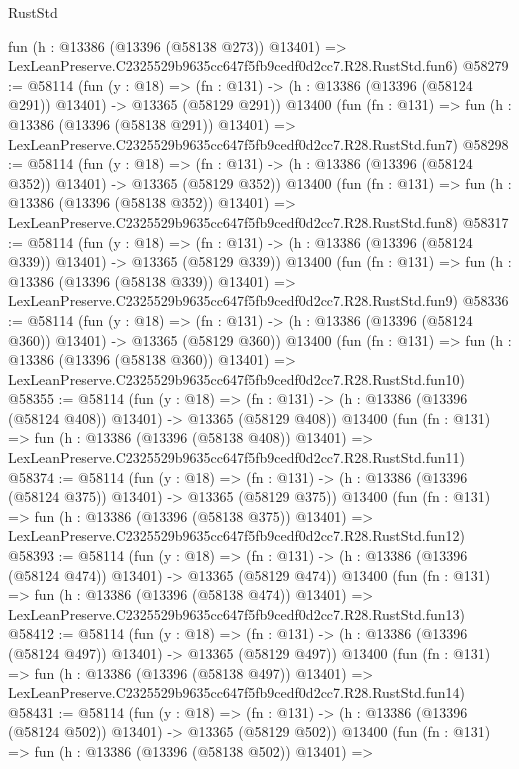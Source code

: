 \begin{lexlean}{RustStd}
\begin{coremodule}
    fun (h : @13386 (@13396 (@58138 @273)) @13401) =>
    LexLeanPreserve.C2325529b9635cc647f5fb9cedf0d2cc7.R28.RustStd.fun6)
@58279 := @58114
    (fun (y : @18) =>
    (fn : @131) -> (h : @13386 (@13396 (@58124 @291)) @13401) -> @13365 (@58129 @291))
    @13400
    (fun (fn : @131) =>
    fun (h : @13386 (@13396 (@58138 @291)) @13401) =>
    LexLeanPreserve.C2325529b9635cc647f5fb9cedf0d2cc7.R28.RustStd.fun7)
@58298 := @58114
    (fun (y : @18) =>
    (fn : @131) -> (h : @13386 (@13396 (@58124 @352)) @13401) -> @13365 (@58129 @352))
    @13400
    (fun (fn : @131) =>
    fun (h : @13386 (@13396 (@58138 @352)) @13401) =>
    LexLeanPreserve.C2325529b9635cc647f5fb9cedf0d2cc7.R28.RustStd.fun8)
@58317 := @58114
    (fun (y : @18) =>
    (fn : @131) -> (h : @13386 (@13396 (@58124 @339)) @13401) -> @13365 (@58129 @339))
    @13400
    (fun (fn : @131) =>
    fun (h : @13386 (@13396 (@58138 @339)) @13401) =>
    LexLeanPreserve.C2325529b9635cc647f5fb9cedf0d2cc7.R28.RustStd.fun9)
@58336 := @58114
    (fun (y : @18) =>
    (fn : @131) -> (h : @13386 (@13396 (@58124 @360)) @13401) -> @13365 (@58129 @360))
    @13400
    (fun (fn : @131) =>
    fun (h : @13386 (@13396 (@58138 @360)) @13401) =>
    LexLeanPreserve.C2325529b9635cc647f5fb9cedf0d2cc7.R28.RustStd.fun10)
@58355 := @58114
    (fun (y : @18) =>
    (fn : @131) -> (h : @13386 (@13396 (@58124 @408)) @13401) -> @13365 (@58129 @408))
    @13400
    (fun (fn : @131) =>
    fun (h : @13386 (@13396 (@58138 @408)) @13401) =>
    LexLeanPreserve.C2325529b9635cc647f5fb9cedf0d2cc7.R28.RustStd.fun11)
@58374 := @58114
    (fun (y : @18) =>
    (fn : @131) -> (h : @13386 (@13396 (@58124 @375)) @13401) -> @13365 (@58129 @375))
    @13400
    (fun (fn : @131) =>
    fun (h : @13386 (@13396 (@58138 @375)) @13401) =>
    LexLeanPreserve.C2325529b9635cc647f5fb9cedf0d2cc7.R28.RustStd.fun12)
@58393 := @58114
    (fun (y : @18) =>
    (fn : @131) -> (h : @13386 (@13396 (@58124 @474)) @13401) -> @13365 (@58129 @474))
    @13400
    (fun (fn : @131) =>
    fun (h : @13386 (@13396 (@58138 @474)) @13401) =>
    LexLeanPreserve.C2325529b9635cc647f5fb9cedf0d2cc7.R28.RustStd.fun13)
@58412 := @58114
    (fun (y : @18) =>
    (fn : @131) -> (h : @13386 (@13396 (@58124 @497)) @13401) -> @13365 (@58129 @497))
    @13400
    (fun (fn : @131) =>
    fun (h : @13386 (@13396 (@58138 @497)) @13401) =>
    LexLeanPreserve.C2325529b9635cc647f5fb9cedf0d2cc7.R28.RustStd.fun14)
@58431 := @58114
    (fun (y : @18) =>
    (fn : @131) -> (h : @13386 (@13396 (@58124 @502)) @13401) -> @13365 (@58129 @502))
    @13400
    (fun (fn : @131) =>
    fun (h : @13386 (@13396 (@58138 @502)) @13401) =>

\end{coremodule}
\end{lexlean}
